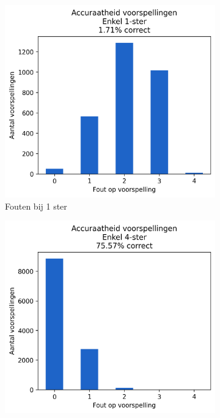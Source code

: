 \begin{figure}[H]
    \begin{subfigure}{.30\textwidth}
        \centering
        \includegraphics[width=1\linewidth]{fig/chapt5/predictor/extreem_1ster.png}
        \caption{Fouten bij 1 ster}
        \label{fig:chapt5_extreem_1ster}
    \end{subfigure}
    \begin{subfigure}{.30\textwidth}
        \centering
        \includegraphics[width=1\linewidth]{fig/chapt5/predictor/extreem_4ster.png}

\end{subfigure}
\end{figure}
